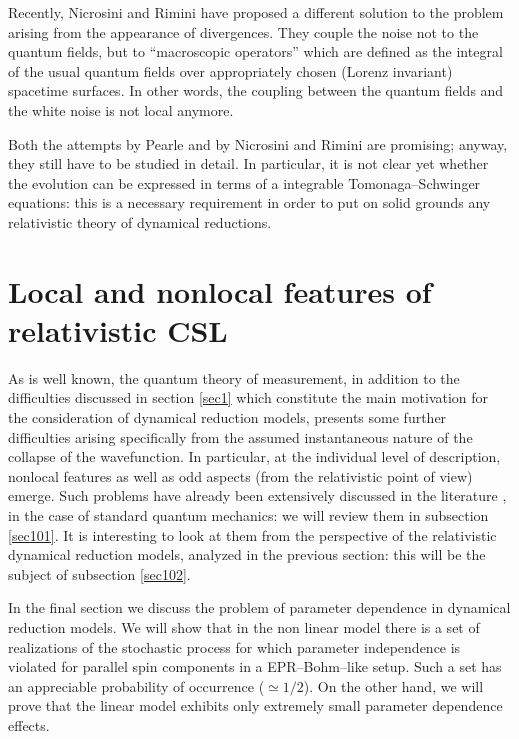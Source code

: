 \documentclass[12pt]{article}
\begin{document}
Recently, Nicrosini and Rimini \cite{bgrel} have proposed a
different solution to the  problem arising from the appearance of
divergences. They couple the noise not to the quantum fields, but to
``macroscopic operators'' which are defined as the integral of the usual
quantum fields over appropriately chosen (Lorenz invariant) spacetime
surfaces. In other words, the coupling between the quantum fields and the
white noise is not local anymore.

Both the attempts by Pearle and by Nicrosini and Rimini are
promising; anyway, they still have to be studied in detail. In
particular, it is not clear yet whether the evolution can be
expressed in terms of a integrable Tomonaga--Schwinger  equations:
this is a necessary requirement in order to put on solid grounds
any relativistic theory of dynamical reductions.



\section{Local and nonlocal features of relativistic CSL}
\label{sec10}

As is well known, the quantum theory of measurement, in addition
to the difficulties discussed in section \ref{sec1} which
constitute the main motivation for the consideration of dynamical
reduction models, presents some further difficulties arising
specifically from the assumed instantaneous nature of the collapse
of the wavefunction. In particular, at the individual level of
description, nonlocal features as well as odd aspects (from the
relativistic point of view) emerge. Such problems have already
been extensively discussed in the literature
\cite{de,bl1,hkd,aa1}, in the case of standard quantum mechanics:
we will review them in subsection \ref{sec101}. It is interesting
to look at them from the perspective of the relativistic dynamical
reduction models, analyzed in the previous section: this will be
the subject of subsection \ref{sec102}.

In the final section we discuss the problem of parameter
dependence in dynamical reduction models. We will show that in the
non linear model there is a set of realizations of the stochastic
process for which parameter independence is violated for parallel
spin components in a EPR--Bohm--like setup. Such a set has an
appreciable probability of occurrence ($\simeq 1/2$). On the other
hand, we will prove that the linear model exhibits only extremely
small parameter dependence effects.
\end{document}
